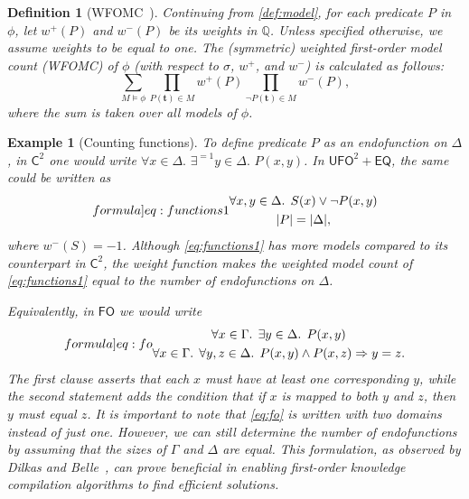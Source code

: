 \documentclass{article}
\newtheorem{definition}{Definition}
\newtheorem{example}{Example}
\theoremstyle{remark}
\newcommand{\Ctwo}{$\mathsf{C}^{2}$}
\newcommand{\FO}{$\mathsf{FO}$}
\newcommand{\UFO}{$\mathsf{UFO}^{2} + \mathsf{EQ}$}
\begin{document}
\begin{definition}[WFOMC~\cite{DBLP:conf/ijcai/BroeckTMDR11}]
  Continuing from \cref{def:model}, for each predicate $P$ in $\phi$, let
  $w^{+}(P)$ and $w^{-}(P)$ be its \emph{weights} in $\mathbb{Q}$. Unless
  specified otherwise, we assume weights to be equal to one. The
  \emph{(symmetric) weighted first-order model count} (WFOMC) of $\phi$ (with
  respect to $\sigma$, $w^{+}$, and $w^{-}$) is calculated as follows:
  \[
    \sum_{M \models \phi} \prod_{P(\mathbf{t}) \in M} w^{+}(P) \prod_{\neg P(\mathbf{t}) \in M} w^{-}(P),
  \]
  where the sum is taken over all models of $\phi$.
\end{definition}

\begin{example}[Counting functions]\label{example:functions}
  To define predicate $P$ as an endofunction on $\Delta$, in \Ctwo{} one would
  write $\forall x \in \Delta\text{. }\exists^{=1} y \in \Delta\text{.
  }P(x, y)$. In \UFO{}, the same could be written as
  \begin{equation}\label[formula]{eq:functions1}
    \begin{gathered}
      \forall x, y \in \Delta\text{. }S(x) \lor \neg P(x, y)\\
      |P| = |\Delta|,
    \end{gathered}
  \end{equation}
  where $w^{-}(S) = -1$. Although \cref{eq:functions1} has more models compared
  to its counterpart in \Ctwo{}, the weight function makes the \emph{weighted}
  model count of \cref{eq:functions1} equal to the number of endofunctions on
  $\Delta$.

  Equivalently, in \FO{} we would write
  \begin{equation}\label[formula]{eq:fo}
    \begin{gathered}
      \forall x \in \Gamma\text{. }\exists y \in \Delta\text{. }P(x, y)\\
      \forall x \in \Gamma\text{. }\forall y, z \in \Delta\text{. }P(x, y) \land P(x, z) \Rightarrow y = z.
    \end{gathered}
  \end{equation}
  The first clause asserts that each $x$ must have at least one corresponding
  $y$, while the second statement adds the condition that if $x$ is mapped to
  both $y$ and $z$, then $y$ must equal $z$. It is important to note that
  \cref{eq:fo} is written with two domains instead of just one. However, we can
  still determine the number of endofunctions by assuming that the sizes of
  $\Gamma$ and $\Delta$ are equal. This formulation, as observed by Dilkas and
  Belle~, can prove beneficial in enabling
  first-order knowledge compilation algorithms to find efficient solutions.
\end{example}
\end{document}
